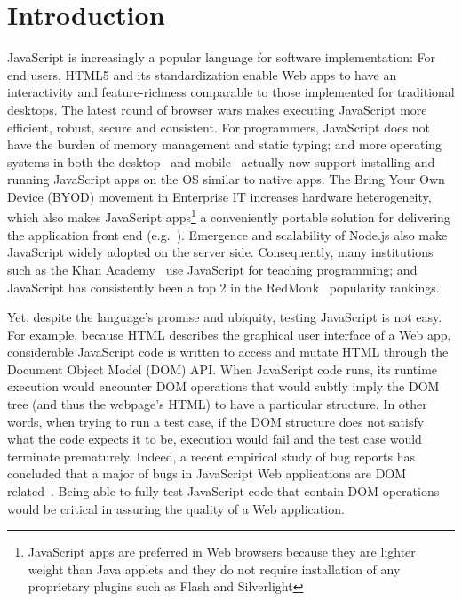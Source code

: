 \section{Introduction}
JavaScript is increasingly a popular language for software implementation: %
For end users, HTML5 and its standardization enable Web apps to have an interactivity and feature-richness comparable to those implemented for traditional desktops.  
The latest round of browser wars makes executing JavaScript more efficient, robust, secure and consistent.  
For programmers, JavaScript does not have the burden of memory management and static typing; and more operating systems in both the desktop~\cite{chromeApps, windows8javascript} 
and mobile~\cite{blackberryWebWorks, firefoxOS, androidWebView, tizen} actually now support installing and running JavaScript apps on the OS similar to native apps.
The Bring Your Own Device (BYOD) movement in Enterprise IT increases hardware heterogeneity, 
which also makes JavaScript apps\footnote{JavaScript apps are preferred in Web browsers because they are lighter weight than Java applets and they do not require installation of any proprietary plugins such as Flash and Silverlight} 
a conveniently portable solution for delivering the application front end (e.g.~\cite{BNSFoffice365}).
Emergence and scalability of Node.js also make JavaScript widely adopted on the server side.  
Consequently, many institutions such as the Khan Academy~\cite{khanAcademy} use JavaScript for teaching programming; and JavaScript has consistently been a top 2 in the RedMonk~\cite{redmonk} popularity rankings.%

Yet, despite the language's promise and ubiquity, testing JavaScript is not easy.  
For example, because HTML describes the graphical user interface of a Web app, considerable JavaScript code is written to access and mutate HTML through the Document Object Model (DOM) API.  
When JavaScript code runs, its runtime execution would encounter DOM operations that would subtly imply the DOM tree (and thus the webpage's HTML) to have a particular structure.  
In other words, when trying to run a test case, if the DOM structure does not satisfy what the code expects it to be, execution would fail and the test case would terminate prematurely.  
Indeed, a recent empirical study of bug reports has concluded that a major of bugs in JavaScript Web applications are DOM related~\cite{frolin2013}.  
Being able to fully test JavaScript code that contain DOM operations would be critical in assuring the quality of a Web application.  


